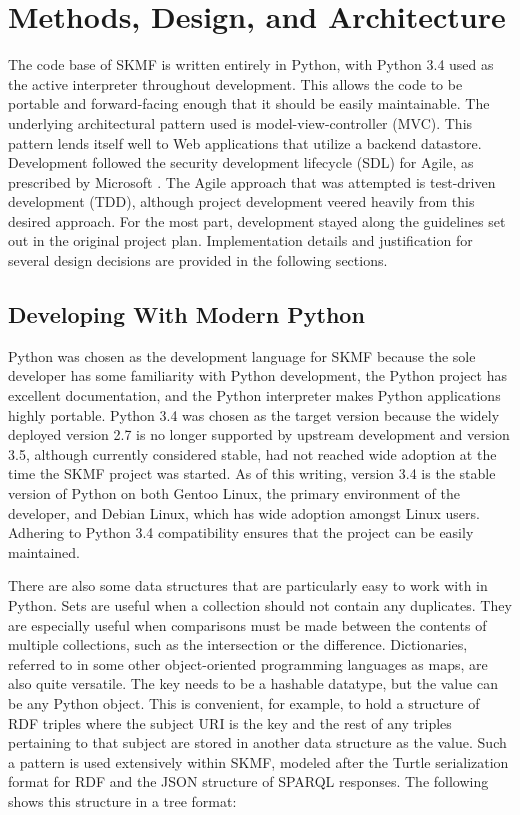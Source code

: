 \chapter{Methods, Design, and Architecture}

The code base of SKMF is written entirely in Python, with Python 3.4 used as the active interpreter throughout development. This allows the code to be portable and forward-facing enough that it should be easily maintainable. The underlying architectural pattern used is model-view-controller (MVC). This pattern lends itself well to Web applications that utilize a backend datastore. Development followed the security development lifecycle (SDL) for Agile, as prescribed by Microsoft \cite{secdevlifecycle}. The Agile approach that was attempted is test-driven development (TDD), although project development veered heavily from this desired approach. For the most part, development stayed along the guidelines set out in the original project plan. Implementation details and justification for several design decisions are provided in the following sections.


\section{Developing With Modern Python}

Python was chosen as the development language for SKMF because the sole developer has some familiarity with Python development, the Python project has excellent documentation, and the Python interpreter makes Python applications highly portable. Python 3.4 was chosen as the target version because the widely deployed version 2.7 is no longer supported by upstream development and version 3.5, although currently considered stable, had not reached wide adoption at the time the SKMF project was started. As of this writing, version 3.4 is the stable version of Python on both Gentoo Linux, the primary environment of the developer, and Debian Linux, which has wide adoption amongst Linux users. Adhering to Python 3.4 compatibility ensures that the project can be easily maintained.

There are also some data structures that are particularly easy to work with in Python. Sets are useful when a collection should not contain any duplicates. They are especially useful when comparisons must be made between the contents of multiple collections, such as the intersection or the difference. Dictionaries, referred to in some other object-oriented programming languages as maps, are also quite versatile. The key needs to be a hashable datatype, but the value can be any Python object. This is convenient, for example, to hold a structure of RDF triples where the subject URI is the key and the rest of any triples pertaining to that subject are stored in another data structure as the value. Such a pattern is used extensively within SKMF, modeled after the Turtle serialization format for RDF and the JSON structure of SPARQL responses. The following shows this structure in a tree format:

